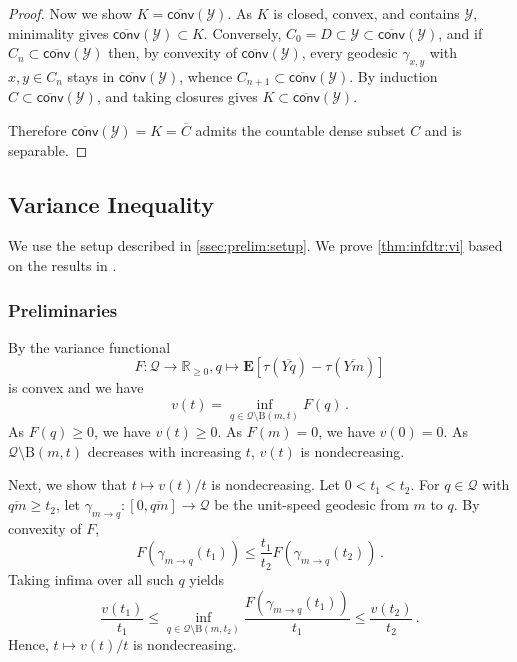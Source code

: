 \documentclass{article}
\newcommand*{\mc}[1]{\mathcal{#1}}
\newcommand*{\ms}[1]{\mathsf{#1}}
\newcommand{\R}{\mathbb{R}}
\newcommand{\Rp}{\R_{\geq0}}
\newcommand{\ball}{\mathrm{B}}
\newcommand{\E}{\mathbf{E}} %
\newcommand{\Eof}[1]{\E[#1]}
\newcommand{\eqfs}{\,.}
\newcommand{\ol}[2]{\overline{#1#2}}
\newcommand{\tran}{\tau}
\newcommand{\ballopen}{\ball}
\begin{document}
\begin{proof}
    Now we show $K=\overline{\ms{conv}}(\mc Y)$. As $K$ is closed, convex, and contains
    $\mc Y$, minimality gives $\overline{\ms{conv}}(\mc Y)\subset K$. Conversely,
    $C_0=D\subset\mc Y\subset\overline{\ms{conv}}(\mc Y)$, and if
    $C_n\subset\overline{\ms{conv}}(\mc Y)$ then, by convexity of
    $\overline{\ms{conv}}(\mc Y)$, every geodesic $\gamma_{x,y}$ with $x,y\in C_n$
    stays in $\overline{\ms{conv}}(\mc Y)$, whence
    $C_{n+1}\subset\overline{\ms{conv}}(\mc Y)$. By induction
    $C\subset\overline{\ms{conv}}(\mc Y)$, and taking closures gives
    $K\subset\overline{\ms{conv}}(\mc Y)$.
    
    Therefore $\overline{\ms{conv}}(\mc Y)=K=\overline C$ admits the countable
    dense subset $C$ and is separable.
\end{proof}

\subsection{Variance Inequality}\label{sec:viconv}

We use the setup described in \cref{ssec:prelim:setup}. We prove \cref{thm:infdtr:vi} based on the results in \cite{varinequ}.

\subsubsection{Preliminaries}

By \cite[Proposition 5.2]{varinequ} the variance functional 
\begin{equation}
    F\colon\mc Q \to \Rp, q\mapsto \Eof{\tran(\ol Yq)-\tran(\ol Ym)}
\end{equation}
is convex and we have 
\begin{equation}
    v(t)=\inf_{q\in \mc Q\setminus \ballopen(m,t)} F(q)
    \eqfs
\end{equation}
As $F(q) \geq 0$, we have $v(t)\geq 0$. As $F(m) = 0$, we have $v(0) = 0$. As $\mc Q\setminus \ballopen(m,t)$ decreases with increasing $t$, $v(t)$ is nondecreasing.

Next, we show that $t\mapsto v(t)/t$ is nondecreasing.
Let $0<t_1<t_2$. For $q\in\mc Q$ with $\ol qm\ge t_2$, let
$\gamma_{m\to q}:[0,\ol qm]\to\mc Q$ be the unit-speed geodesic from $m$ to $q$.
By convexity of $F$,
\begin{equation}
    F(\gamma_{m\to q}(t_1))
    \leq
    \frac{t_1}{t_2}F(\gamma_{m\to q}(t_2))
    \eqfs
\end{equation}
Taking infima over all such $q$ yields
\begin{equation}
    \frac{v(t_1)}{t_1} \leq \inf_{q\in \mc Q\setminus \ballopen(m, t_2)} \frac{F(\gamma_{m\to q}(t_1))}{t_1} \leq \frac{v(t_2)}{t_2}
    \eqfs
\end{equation}
Hence, $t\mapsto v(t)/t$ is nondecreasing.
\end{document}
